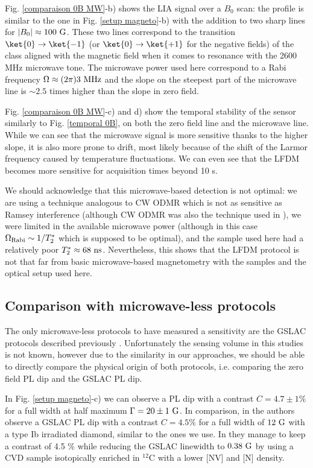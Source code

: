 \documentclass[a4paper,11pt]{report}
\begin{document}
\begin{refsection}
Fig. \ref{comparaison 0B MW}-b) shows the LIA signal over a $B_0$ scan: the profile is similar to the one in Fig. \ref{setup magneto}-b) with the addition to two sharp lines for $|B_0| \approx 100\ \rm G$. These two lines correspond to the transition $\ket{0} \to \ket{-1}$ (or $\ket{0} \to \ket{+1}$ for the negative fields) of the class aligned with the magnetic field when it comes to resonance with the 2600 MHz microwave tone. The microwave power used here correspond to a Rabi frequency $\Omega \approx (2\pi) 3\ \rm MHz$ and the slope on the steepest part of the microwave line is $\sim 2.5$ times higher than the slope in zero field.

Fig. \ref{comparaison 0B MW}-c) and d) show the temporal stability of the sensor similarly to Fig. \ref{temporal 0B}, on both the zero field line and the microwave line. While we can see that the microwave signal is more sensitive thanks to the higher slope, it is also more prone to drift, most likely because of the shift of the Larmor frequency caused by temperature fluctuations. We can even see that the LFDM becomes more sensitive for acquisition times beyond 10 s.

We should acknowledge that this microwave-based detection is not optimal: we are using a technique analogous to CW ODMR which is not as sensitive as Ramsey interference (although CW ODMR was also the technique used in \citep{barry2016optical}), we were limited in the available microwave power (although in this case $\Omega_{\rm Rabi} \sim 1/T_2^*$ which is supposed to be optimal), and the sample used here had a relatively poor $T_2^* \approx 68\ \rm ns$. Nevertheless, this shows that the LFDM protocol is not that far from basic microwave-based magnetometry with the samples and the optical setup used here.

\subsection{Comparison with microwave-less protocols}
The only microwave-less protocols to have measured a sensitivity are the GSLAC protocols described previously \citep{wickenbrock2016microwave, zheng2020microwave}. Unfortunately the sensing volume in this studies is not known, however due to the similarity in our approaches, we should be able to directly compare the physical origin of both protocols, i.e. comparing the zero field PL dip and the GSLAC PL dip.

In Fig. \ref{setup magneto}-c) we can observe a PL dip with a contrast $C=4.7\pm 1 \% $ for a full width at half maximum $\Gamma=20 \pm 1\ \rm G$. In comparison, in \citep{wickenbrock2016microwave} the authors observe a GSLAC PL dip with a contrast $C=4.5 \%$ for a full width of $12 \ \rm G$ with a type Ib irradiated diamond, similar to the ones we use. In \citep{zheng2020microwave} they manage to keep a contrast of 4.5 \% while reducing the GSLAC linewidth to $0.38\ \rm G$ by using a CVD sample isotopically enriched in $^{12}$C with a lower [NV] and [N] density.


\end{refsection}
\end{document}
